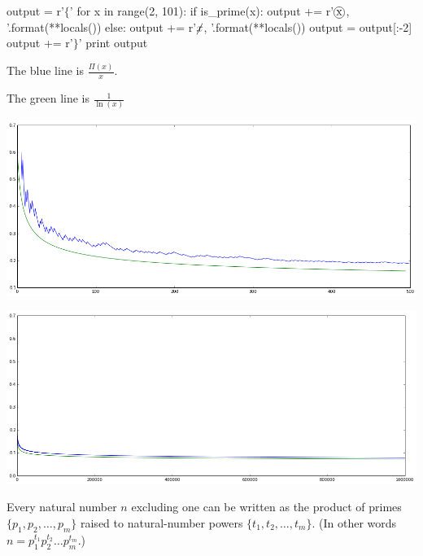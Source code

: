 \item 
\newcommand*\circled[1]{
\tikz[baseline=(char.base)]{
\node[shape=circle,draw,inner sep=1pt] (char) {#1};
}
}

\begin{python}[tools.py]
output = r'$\{$'
for x in range(2, 101):
    if is_prime(x):
        output += r'$\circled{{{x}}}$, '.format(**locals())
    else:
        output += r'$\cancel{{{x}}}$, '.format(**locals())
output = output[:-2]
output += r'$\}$'
print output
\end{python}

\item 
The blue line is $\frac{\Pi(x)}{x}$.

The green line is $\frac{1}{\ln(x)}$

\includegraphics[width=6in]{primes_small.png}

\includegraphics[width=6in]{primes_large.png}

\item Every natural number \(n\) excluding one can be written as the product of primes \(\{p_1, p_2, \dots, p_m\}\) raised to natural-number powers \(\{t_1, t_2, \dots, t_m\}\). (In other words \(n = p_1^{t_1} p_2^{t_2} \dots p_m^{t_m}\).)

